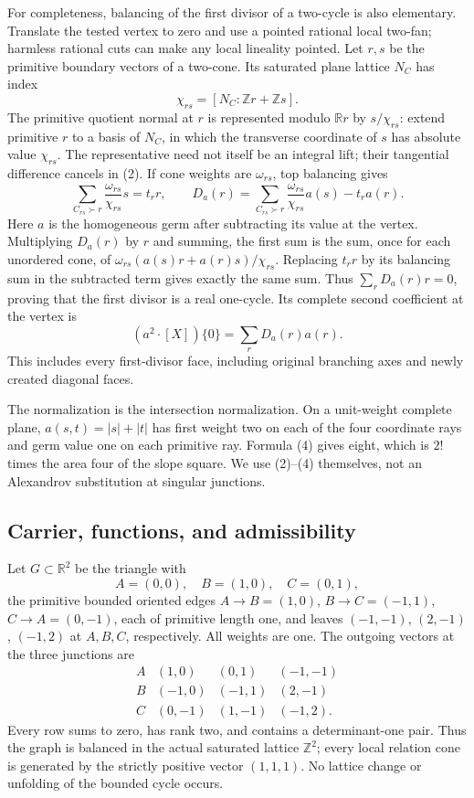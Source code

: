 \documentclass[
  10pt,
]{article}
\begin{document}
For completeness, balancing of the first divisor of a two-cycle is also
elementary. Translate the tested vertex to zero and use a pointed
rational local two-fan; harmless rational cuts can make any local
lineality pointed. Let \(r,s\) be the primitive boundary vectors of a
two-cone. Its saturated plane lattice \(N_C\) has index \[
 \chi_{rs}=[N_C:\mathbb{Z}r+\mathbb{Z}s].
\] The primitive quotient normal at \(r\) is represented modulo
\(\mathbb{R}r\) by \(s/\chi_{rs}\): extend primitive \(r\) to a basis of
\(N_C\), in which the transverse coordinate of \(s\) has absolute value
\(\chi_{rs}\). The representative need not itself be an integral lift;
their tangential difference cancels in (2). If cone weights are
\(\omega_{rs}\), top balancing gives \[
 \sum_{C_{rs}\succ r}\frac{\omega_{rs}}{\chi_{rs}}s=t_r r,
 \qquad
 D_a(r)=\sum_{C_{rs}\succ r}\frac{\omega_{rs}}{\chi_{rs}}a(s)-t_ra(r).
 \tag{3}
\] Here \(a\) is the homogeneous germ after subtracting its value at the
vertex. Multiplying \(D_a(r)\) by \(r\) and summing, the first sum is
the sum, once for each unordered cone, of
\(\omega_{rs}(a(s)r+a(r)s)/\chi_{rs}\). Replacing \(t_rr\) by its
balancing sum in the subtracted term gives exactly the same sum. Thus
\(\sum_rD_a(r)r=0\), proving that the first divisor is a real one-cycle.
Its complete second coefficient at the vertex is \[
                      (a^2\cdot[X])\{0\}=\sum_rD_a(r)a(r).
 \tag{4}
\] This includes every first-divisor face, including original branching
axes and newly created diagonal faces.

The normalization is the intersection normalization. On a unit-weight
complete plane, \(a(s,t)=|s|+|t|\) has first weight two on each of the
four coordinate rays and germ value one on each primitive ray. Formula
(4) gives eight, which is \(2!\) times the area four of the slope
square. We use (2)--(4) themselves, not an Alexandrov substitution at
singular junctions.

\subsection{Carrier, functions, and
admissibility}\label{carrier-functions-and-admissibility}

Let \(G\subset\mathbb{R}^2\) be the triangle with \[
 A=(0,0),\quad B=(1,0),\quad C=(0,1),
\] the primitive bounded oriented edges \(A\to B=(1,0)\),
\(B\to C=(-1,1)\), \(C\to A=(0,-1)\), each of primitive length one, and
leaves \((-1,-1)\), \((2,-1)\), \((-1,2)\) at \(A,B,C\), respectively.
All weights are one. The outgoing vectors at the three junctions are \[
\begin{array}{c|ccc}
 A&(1,0)&(0,1)&(-1,-1)\\
 B&(-1,0)&(-1,1)&(2,-1)\\
 C&(0,-1)&(1,-1)&(-1,2).
\end{array}
\] Every row sums to zero, has rank two, and contains a determinant-one
pair. Thus the graph is balanced in the actual saturated lattice
\(\mathbb{Z}^2\); every local relation cone is generated by the strictly
positive vector \((1,1,1)\). No lattice change or unfolding of the
bounded cycle occurs.
\end{document}
